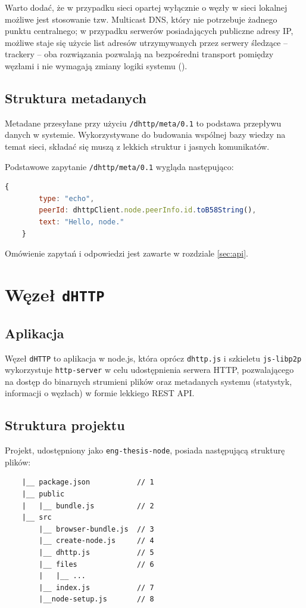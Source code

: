 Warto dodać, że w przypadku sieci opartej wyłącznie o węzły w sieci lokalnej możliwe jest stosowanie tzw. Multicast DNS, który nie potrzebuje żadnego punktu centralnego; w przypadku serwerów posiadających publiczne adresy IP, możliwe staje się użycie list adresów utrzymywanych przez serwery śledzące -- trackery -- oba rozwiązania pozwalają na bezpośredni transport pomiędzy węzłami i nie wymagają zmiany logiki systemu (\cite{discoverylibp2p}).

\subsection{Struktura metadanych}
\label{sub:metadata}

Metadane przesyłane przy użyciu \texttt{/dhttp/meta/0.1} to podstawa przepływu danych w systemie. Wykorzystywane do budowania wspólnej bazy wiedzy na temat sieci, składać się muszą z lekkich struktur i jasnych komunikatów.

Podstawowe zapytanie \texttt{/dhttp/meta/0.1} wygląda następująco:

\begin{lstlisting}[language=javascript]
    {
        type: "echo",
        peerId: dhttpClient.node.peerInfo.id.toB58String(),
        text: "Hello, node."
    }
\end{lstlisting}

Omówienie zapytań i odpowiedzi jest zawarte w rozdziale \ref{sec:api}.



\section{Węzeł \texttt{dHTTP}}

\subsection{Aplikacja}

Węzeł \texttt{dHTTP} to aplikacja w node.js, która oprócz \texttt{dhttp.js} i szkieletu \texttt{js-libp2p} wykorzystuje \texttt{http-server} w celu udostępnienia serwera HTTP, pozwalającego na dostęp do binarnych strumieni plików oraz metadanych systemu (statystyk, informacji o węzłach) w formie lekkiego REST API.

\subsection{Struktura projektu}
\label{sec:transportAlgorithm}
Projekt, udostępniony jako \texttt{eng-thesis-node}, posiada następującą strukturę plików:
\begin{lstlisting}
    |__ package.json           // 1
    |__ public
    |   |__ bundle.js          // 2
    |__ src
        |__ browser-bundle.js  // 3
        |__ create-node.js     // 4
        |__ dhttp.js           // 5
        |__ files              // 6
        |   |__ ...
        |__ index.js           // 7
        |__node-setup.js       // 8
\end{lstlisting}

